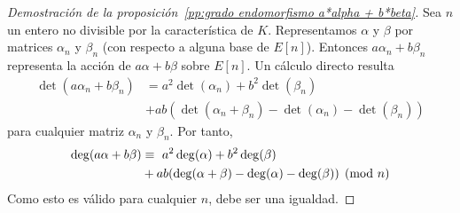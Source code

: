\begin{proof}[Demostración de la proposición~\ref{pp:grado endomorfismo a*alpha + b*beta}]
Sea $n$ un entero no divisible por la característica de $K$. Representamos $\alpha$ y $\beta$ por matrices $\alpha_n$ y $\beta_n$ (con respecto a alguna base de $E[n]$). Entonces $a \alpha_n + b \beta_n$ representa la acción de $a \alpha + b \beta$ sobre $E[n]$. Un cálculo directo resulta
\begin{align*}
	\det(a \alpha_n + b \beta_n) &= a^2 \det(\alpha_n) + b^2 \det(\beta_n) \\
	&+ a b (\det(\alpha_n + \beta_n) - \det(\alpha_n) - \det(\beta_n))
\end{align*}
para cualquier matriz $\alpha_n$ y $\beta_n$. Por tanto,
\begin{align*}
	\deg(a \alpha + b \beta) &\equiv \ a^2 \deg(\alpha) + b^2 \deg(\beta) \\
	&+ a b (\deg(\alpha + \beta) - \deg(\alpha) - \deg(\beta)) \pmod{n}
\end{align*}
Como esto es válido para cualquier $n$, debe ser una igualdad.
\end{proof}
